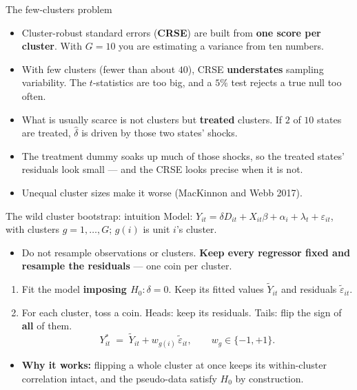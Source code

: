 \documentclass[
  11pt,
  ignorenonframetext,
  aspectratio=169,
]{beamer}
\providecommand{\tightlist}{%
  \setlength{\itemsep}{0pt}\setlength{\parskip}{0pt}}
\begin{document}
\begin{frame}{The few-clusters problem}
\protect{}\label{the-few-clusters-problem}
\begin{itemize}
\tightlist
\item
  Cluster-robust standard errors (\textbf{CRSE}) are built from
  \textbf{one score per cluster}. With \(G = 10\) you are estimating a
  variance from ten numbers.
\item
  With few clusters (fewer than about \(40\)), CRSE \textbf{understates}
  sampling variability. The \(t\)-statistics are too big, and a \(5\%\)
  test rejects a true null too often.
\end{itemize}

\vspace{0.3em}

\begin{itemize}
\tightlist
\item
  What is usually scarce is not clusters but \textbf{treated} clusters.
  If \(2\) of \(10\) states are treated, \(\hat\delta\) is driven by
  those two states' shocks.
\item
  The treatment dummy soaks up much of those shocks, so the treated
  states' residuals look small --- and the CRSE looks precise when it is
  not.
\item
  Unequal cluster sizes make it worse (MacKinnon and Webb 2017).
\end{itemize}
\end{frame}

\begin{frame}{The wild cluster bootstrap: intuition}
\protect{}\label{the-wild-cluster-bootstrap-intuition}
Model:
\(Y_{it} = \delta D_{it} + X_{it}\beta + \alpha_i + \lambda_t + \varepsilon_{it}\),
with clusters \(g = 1, \dots, G\); \(g(i)\) is unit \(i\)'s cluster.

\begin{itemize}
\tightlist
\item
  Do not resample observations or clusters. \textbf{Keep every regressor
  fixed and resample the residuals} --- one coin per cluster.
\end{itemize}

\begin{enumerate}
\tightlist
\item
  Fit the model \textbf{imposing \(H_0: \delta = 0\)}. Keep its fitted
  values \(\tilde Y_{it}\) and residuals \(\tilde\varepsilon_{it}\).
\item
  For each cluster, toss a coin. Heads: keep its residuals. Tails: flip
  the sign of \textbf{all} of them. \[
  Y^{*}_{it} \;=\; \tilde Y_{it} + w_{g(i)}\,\tilde\varepsilon_{it}, \qquad w_g \in \{-1, +1\} .
  \]
\end{enumerate}

\begin{itemize}
\tightlist
\item
  \textbf{Why it works:} flipping a whole cluster at once keeps its
  within-cluster correlation intact, and the pseudo-data satisfy \(H_0\)
  by construction.
\end{itemize}
\end{frame}
\end{document}
